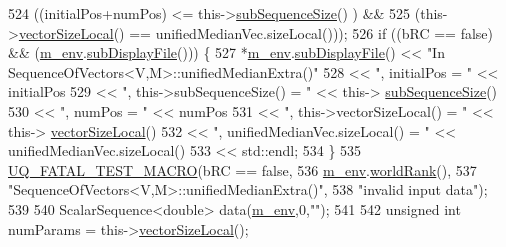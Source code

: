 \begin{DoxyCode}
524               ((initialPos+numPos)     <= this->\hyperlink{class_q_u_e_s_o_1_1_sequence_of_vectors_a0224bd3e961d86af5d2886301c0c2b86}{subSequenceSize}()     ) &&
525               (this->\hyperlink{class_q_u_e_s_o_1_1_base_vector_sequence_a2fefedf9e5b90f22881103b3f92555f6}{vectorSizeLocal}() == unifiedMedianVec.sizeLocal()));
526   \textcolor{keywordflow}{if} ((bRC == \textcolor{keyword}{false}) && (\hyperlink{class_q_u_e_s_o_1_1_base_vector_sequence_a8e8824d2a63c5a43bcc6473e3a0491e8}{m\_env}.\hyperlink{class_q_u_e_s_o_1_1_base_environment_a8a0064746ae8dddfece4229b9ad374d6}{subDisplayFile}())) \{
527     *\hyperlink{class_q_u_e_s_o_1_1_base_vector_sequence_a8e8824d2a63c5a43bcc6473e3a0491e8}{m\_env}.\hyperlink{class_q_u_e_s_o_1_1_base_environment_a8a0064746ae8dddfece4229b9ad374d6}{subDisplayFile}() << \textcolor{stringliteral}{"In SequenceOfVectors<V,M>::unifiedMedianExtra()"}
528                             << \textcolor{stringliteral}{", initialPos = "}                   << initialPos
529                             << \textcolor{stringliteral}{", this->subSequenceSize() = "}      << this->
      \hyperlink{class_q_u_e_s_o_1_1_sequence_of_vectors_a0224bd3e961d86af5d2886301c0c2b86}{subSequenceSize}()
530                             << \textcolor{stringliteral}{", numPos = "}                       << numPos
531                             << \textcolor{stringliteral}{", this->vectorSizeLocal() = "}      << this->
      \hyperlink{class_q_u_e_s_o_1_1_base_vector_sequence_a2fefedf9e5b90f22881103b3f92555f6}{vectorSizeLocal}()
532                             << \textcolor{stringliteral}{", unifiedMedianVec.sizeLocal() = "} << unifiedMedianVec.sizeLocal()
533                             << std::endl;
534   \}
535   \hyperlink{_defines_8h_a56d63d18d0a6d45757de47fcc06f574d}{UQ\_FATAL\_TEST\_MACRO}(bRC == \textcolor{keyword}{false},
536                       \hyperlink{class_q_u_e_s_o_1_1_base_vector_sequence_a8e8824d2a63c5a43bcc6473e3a0491e8}{m\_env}.\hyperlink{class_q_u_e_s_o_1_1_base_environment_a78b57112bbd0e6dd0e8afec00b40ffa7}{worldRank}(),
537                       \textcolor{stringliteral}{"SequenceOfVectors<V,M>::unifiedMedianExtra()"},
538                       \textcolor{stringliteral}{"invalid input data"});
539 
540   ScalarSequence<double> data(\hyperlink{class_q_u_e_s_o_1_1_base_vector_sequence_a8e8824d2a63c5a43bcc6473e3a0491e8}{m\_env},0,\textcolor{stringliteral}{""});
541 
542   \textcolor{keywordtype}{unsigned} \textcolor{keywordtype}{int} numParams = this->\hyperlink{class_q_u_e_s_o_1_1_base_vector_sequence_a2fefedf9e5b90f22881103b3f92555f6}{vectorSizeLocal}();

\end{DoxyCode}
